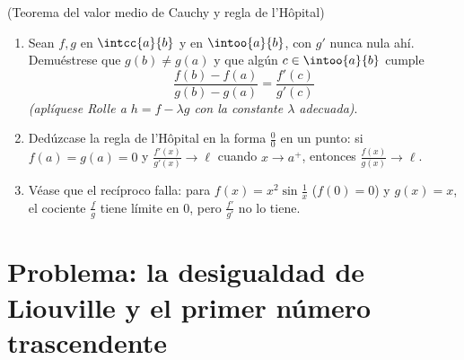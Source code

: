 \begin{exercise}[$\star\star\star$]\label{exo:b1:derivative:12}
(Teorema del valor medio de Cauchy y regla de l'Hôpital)
\begin{enumerate}
  \item Sean $f, g$  en $\intcc{a}{b}$ y  en
        $\intoo{a}{b}$, con $g'$ nunca nula ahí. Demuéstrese que
        $g(b) \neq g(a)$ y que algún $c \in \intoo{a}{b}$ cumple
        \[
        \frac{f(b) - f(a)}{g(b) - g(a)} = \frac{f'(c)}{g'(c)}
        \]
        \emph{(aplíquese Rolle a $h = f - \lambda g$ con la constante
        $\lambda$ adecuada)}.
  \item Dedúzcase la regla de l'Hôpital en la forma $\frac00$ en un
        punto: si $f(a) = g(a) = 0$ y
        $\frac{f'(x)}{g'(x)} \to \ell$ cuando $x \to a^+$, entonces
        $\frac{f(x)}{g(x)} \to \ell$.
  \item Véase que el recíproco falla: para $f(x) = x^2\sin\frac1x$
        ($f(0) = 0$) y $g(x) = x$, el cociente $\frac{f}{g}$ tiene
        límite en $0$, pero $\frac{f'}{g'}$ no lo tiene.
\end{enumerate}
\end{exercise}

\section{Problema: la desigualdad de Liouville y el primer número
trascendente}

